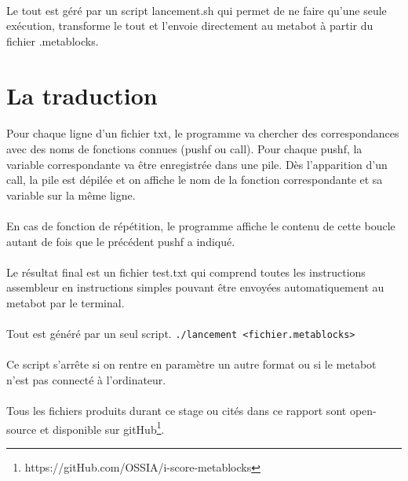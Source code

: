 \documentclass[10pt,a4paper]{report}
\begin{document}
\paragraph{}
Le tout est géré par un script lancement.sh qui permet de ne faire qu'une seule exécution, transforme le tout et l'envoie directement au metabot à partir du fichier .metablocks.

\paragraph{}
\section{La traduction}
\paragraph{}
Pour chaque ligne d'un fichier txt, le programme va chercher des correspondances avec des noms de fonctions connues (pushf ou call). Pour chaque pushf, la variable correspondante va être enregistrée dans une pile. Dès l'apparition d'un call, la pile est dépilée et on affiche le nom de la fonction correspondante et sa variable sur la même ligne.
\paragraph{}
En cas de fonction de répétition, le programme affiche le contenu de cette boucle autant de fois que le précédent pushf a indiqué.
\paragraph{}
Le résultat final est un fichier test.txt qui comprend toutes les instructions assembleur en instructions simples pouvant être envoyées automatiquement au metabot par le terminal.
\paragraph{}
Tout est généré par un seul script.
\texttt{./lancement <fichier.metablocks>}
\paragraph{}
Ce script s'arrête si on rentre en paramètre un autre format ou si le metabot n'est pas connecté à l'ordinateur.
\paragraph{}
Tous les fichiers produits durant ce stage ou cités dans ce rapport sont open-source et disponible sur  gitHub\footnote{https://gitHub.com/OSSIA/i-score-metablocks}.
\end{document}
